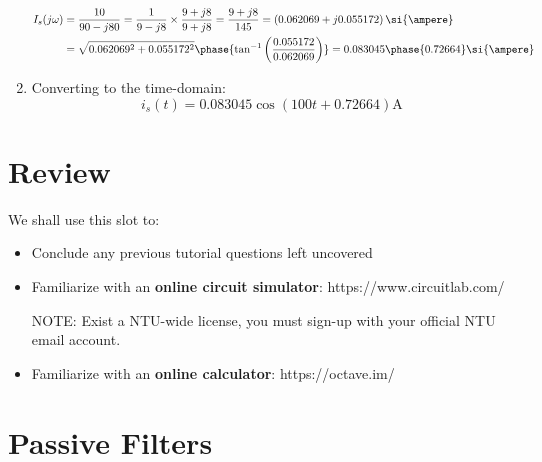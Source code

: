 \documentclass[10pt,a4paper]{memoir}
\begin{document}
\begin{solution}
\begin{enumerate}
\begin{align*}
    I_s(j\omega) &= \dfrac{10}{90 - j80} = \dfrac{1}{9 - j8}\times\dfrac{9 + j8}{9 + j8} = \dfrac{9 + j8}{145} = \left( 0.062069 + j0.055172 \right)\si{\ampere} \\
    &= \sqrt{0.062069^2 + 0.055172^2}\phase{\tan^{-1}\left(\frac{0.055172}{0.062069}\right)} = 0.083045\phase{0.72664}\si{\ampere}
  \end{align*}
  \item Converting to the time-domain:
  \begin{equation*}
    i_s(t) = 0.083045\cos{\left(100t + 0.72664\right)} \si{\ampere} 
  \end{equation*}
  \end{enumerate}
\end{solution}

\chapter{Review}
We shall use this slot to:
\begin{itemize}
  \item Conclude any previous tutorial questions left uncovered
  \item Familiarize with an \textbf{online circuit simulator}: https://www.circuitlab.com/
  
  NOTE: Exist a NTU-wide license, you must sign-up with your official NTU email account.
  \item Familiarize with an \textbf{online calculator}: https://octave.im/
\end{itemize}

\chapter{Passive Filters}
\end{document}
